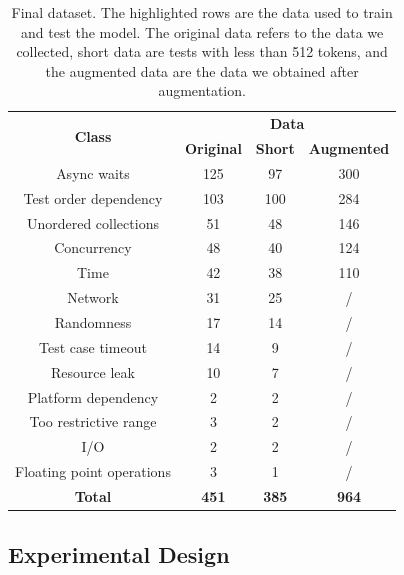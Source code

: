 \begin{table}[htbp]
\centering
\caption{Final dataset. The highlighted rows are the data used to train and test the model. The original data refers to the data we collected, short data are tests with less than 512 tokens, and the augmented data are the data we obtained after augmentation.}
\begin{tabular}{c|c|c|c}
\toprule
\multirow{2}{*}{\textbf{Class}} & \multicolumn{3}{c}{\textbf{Data}} \\
\cmidrule(r){2-4} 
\textbf{} & \textbf{Original}& 
\textbf{Short} &
\textbf{Augmented}  \\
\midrule
	
\rowcolor{Gray}
Async waits & 125 & 97 &  300\\
\midrule
\rowcolor{Gray}
Test order dependency & 103 & 100 &  284\\ 
\midrule
\rowcolor{Gray}
Unordered collections & 51 & 48 & 146 \\
\midrule
\rowcolor{Gray}
Concurrency & 48 & 40 & 124 \\
\midrule
\rowcolor{Gray}
Time & 42 & 38 & 110 \\
\midrule
Network & 31 & 25 & /\\
\midrule
Randomness & 17 & 14 &  / \\
\midrule
Test case timeout & 14 & 9 &  / \\
\midrule 
Resource leak & 10 & 7 &  / \\
\midrule
Platform dependency & 2 & 2 &  / \\
\midrule 
Too restrictive range & 3 & 2 & / \\
\midrule 
I/O & 2 & 2 & / \\
\midrule 
Floating point operations & 3 & 1 & /\\
\midrule

\textbf{Total} & \textbf{451} & \textbf{385} &  \textbf{964} \\
\bottomrule
\end{tabular}
\label{tabData}
\end{table}


\subsection{Experimental Design}
